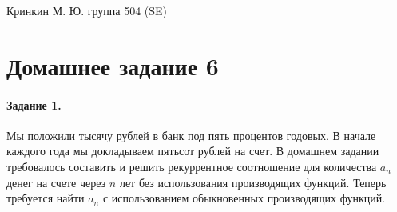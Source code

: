 \documentclass[a4paper,12pt]{article}
\begin{document}
\sloppy

\lstset{
	basicstyle=\small,
	stringstyle=\ttfamily,
	showstringspaces=false,
	columns=fixed,
	breaklines=true,
	numbers=right,
	numberstyle=\tiny
}

\newtheorem{Def}{Определение}[section]
\newtheorem{Th}{Теорема}
\newtheorem{Lem}[Th]{Лемма}
\newenvironment{Proof}
	{\par\noindent{\bf Доказательство.}}
	{\hfill$\scriptstyle\blacksquare$}
\newenvironment{Solution}
	{\par\noindent{\bf Решение.}}
	{\hfill$\scriptstyle\blacksquare$}


\begin{flushright}
	Кринкин М. Ю. группа 504 (SE)
\end{flushright}

\section{Домашнее задание 6}

\paragraph{Задание 1.} Мы положили тысячу рублей в банк под пять процентов годовых. В начале каждого года мы докладываем пятьсот рублей на счет. В домашнем задании требовалось составить и решить рекуррентное соотношение для количества $a_n$ денег на счете через $n$ лет без использования производящих функций. Теперь требуется найти $a_n$ с использованием обыкновенных производящих функций.
\end{document}
